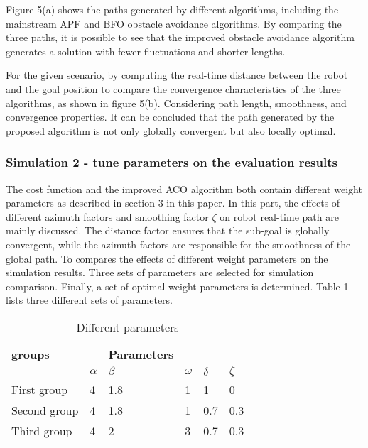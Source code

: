 \documentclass{iosart2c}
\begin{document}
Figure 5(a) shows the paths generated by different algorithms, including the mainstream APF and BFO obstacle avoidance algorithms. By comparing the three paths, it is possible to see that the improved obstacle avoidance algorithm generates a solution with fewer fluctuations and shorter lengths.

For the given scenario, by computing the real-time distance between the robot and the goal position to compare the convergence characteristics of the three algorithms, as shown in figure 5(b). Considering path length, smoothness, and convergence properties. It can be concluded that the path generated by the proposed algorithm is not only globally convergent but also locally optimal.

\subsubsection{Simulation 2 - tune parameters on the evaluation results}\label{s4.1.2}
The cost function and the improved ACO algorithm both contain different weight parameters as described in section 3 in this paper. In this part, the effects of different azimuth factors and smoothing factor $\zeta$ on robot real-time path are mainly discussed. The distance factor ensures that the sub-goal is globally convergent, while the azimuth factors are responsible for the smoothness of the global path. To compares the effects of different weight parameters on the simulation results. Three sets of parameters are selected for simulation comparison. Finally, a set of optimal weight parameters is determined. Table 1 lists three different sets of parameters.

\begin{table}[ht]
\renewcommand\tabcolsep{4.0pt}  %
\caption{Different parameters} \label{t1}
\centering
\begin{tabular}{p{1.7cm}p{0.4cm}p{0.4cm}p{0.4cm}p{0.4cm}p{0.4cm}}
\hline
\centering
\textbf{groups} &    &  \textbf{Parameters}  &    &    \\ \cline{2-6}     %
\centering
      &$\alpha$  & $\beta$      & $\omega$ & $\delta$ & $\zeta$ \\ \hline  %
\centering
First group   & 4     & 1.8     & 1        & 1      & 0    \\
\centering
Second group  & 4     & 1.8     & 1        & 0.7    & 0.3   \\
\centering
Third group   & 4     & 2       & 3        & 0.7    & 0.3   \\ \hline    
\end{tabular}
\end{table}
\end{document}
